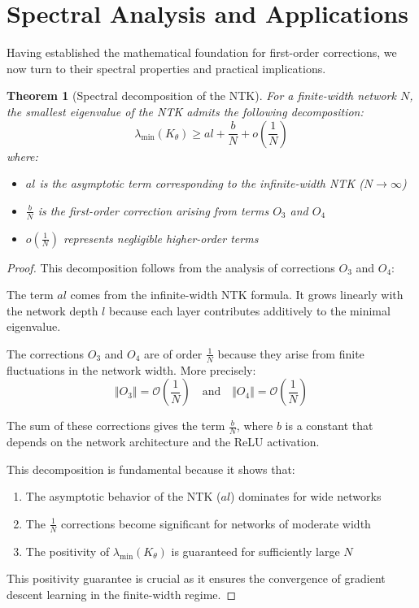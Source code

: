 \documentclass[11pt,a4paper]{article}
\newtheorem{theorem}{Theorem}[section]
\theoremstyle{definition}
\begin{document}
\newpage
\section{Spectral Analysis and Applications}

Having established the mathematical foundation for first-order corrections, we now turn to their spectral properties and practical implications.

\begin{theorem}[Spectral decomposition of the NTK]\label{thm:spectral}
For a finite-width network $N$, the smallest eigenvalue of the NTK admits the following decomposition:
\[ \lambda_{\min}(K_\theta) \geq al + \frac{b}{N} + o(\frac{1}{N}) \]
where:
\begin{itemize}
\item $al$ is the asymptotic term corresponding to the infinite-width NTK ($N \to \infty$)
\item $\frac{b}{N}$ is the first-order correction arising from terms $O_3$ and $O_4$
\item $o(\frac{1}{N})$ represents negligible higher-order terms
\end{itemize}
\end{theorem}

\begin{proof}
This decomposition follows from the analysis of corrections $O_3$ and $O_4$:

The term $al$ comes from the infinite-width NTK formula. It grows linearly with the network depth $l$ because each layer contributes additively to the minimal eigenvalue.

The corrections $O_3$ and $O_4$ are of order $\frac{1}{N}$ because they arise from finite fluctuations in the network width. More precisely:
\[ \Vert O_3 \Vert = \mathcal{O}(\frac{1}{N}) \quad \text{and} \quad \Vert O_4 \Vert = \mathcal{O}(\frac{1}{N}) \]

The sum of these corrections gives the term $\frac{b}{N}$, where $b$ is a constant that depends on the network architecture and the ReLU activation.

This decomposition is fundamental because it shows that:
\begin{enumerate}
\item The asymptotic behavior of the NTK ($al$) dominates for wide networks
\item The $\frac{1}{N}$ corrections become significant for networks of moderate width
\item The positivity of $\lambda_{\min}(K_\theta)$ is guaranteed for sufficiently large $N$
\end{enumerate}

This positivity guarantee is crucial as it ensures the convergence of gradient descent learning in the finite-width regime.
\end{proof}
\end{document}
